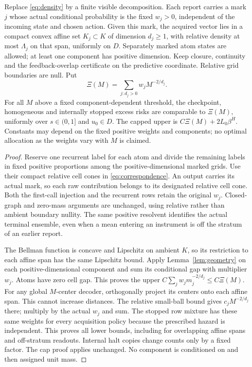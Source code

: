 \begin{theorem}\label{thm:strata}
Replace \eqref{eq:density} by a finite visible decomposition. Each report carries a mark $j$ whose actual conditional probability is the fixed $w_j>0$, independent of the incoming state and chosen action. Given this mark, the acquired vector lies in a compact convex affine set $K_j\subset K$ of dimension $d_j\ge1$, with relative density at most $\Lambda_j$ on that span, uniformly on $D$. Separately marked atom states are allowed; at least one component has positive dimension. Keep closure, continuity and the feedback-overlap certificate on the predictive coordinate. Relative grid boundaries are null. Put
\begin{equation}\label{eq:xi}
 \Xi(M)=\sum_{j:d_j>0}w_jM^{-2/d_j}.
\end{equation}
For all $M$ above a fixed component-dependent threshold, the checkpoint, homogeneous and internally stopped excess risks are comparable to $\Xi(M)$, uniformly over $s\in(0,1]$ and $u_0\in D$. The capped upper is $C\Xi(M)+2L_0\beta^H$. Constants may depend on the fixed positive weights and components; no optimal allocation as the weights vary with $M$ is claimed.
\end{theorem}
\begin{proof}
Reserve one recurrent label for each atom and divide the remaining labels in fixed positive proportions among the positive-dimensional marked grids. Use their compact relative cell cones in \eqref{eq:correspondence}. An output carries its actual mark, so each raw contribution belongs to its designated relative cell cone. Both the first-call injection and the recurrent rows retain the original $w_j$. Closed-graph and zero-mass arguments are unchanged, using relative rather than ambient boundary nullity. The same positive resolvent identifies the actual terminal ensemble, even when a mean entering an instrument is off the stratum of an earlier report.

The Bellman function is concave and Lipschitz on ambient $K$, so its restriction to each affine span has the same Lipschitz bound. Apply Lemma~\ref{lem:geometry} on each positive-dimensional component and sum its conditional gap with multiplier $w_j$. Atoms have zero cell gap. This proves the upper $C\sum_jw_jm_j^{-2/d_j}\le C\Xi(M)$. For any global $M$-center decoder, orthogonally project its centers onto each affine span. This cannot increase distances. The relative small-ball bound gives $c_jM^{-2/d_j}$ there; multiply by the actual $w_j$ and sum. The stopped row mixture has these same weights for every acquisition policy because the prescribed hazard is independent. This proves all lower bounds, including for overlapping affine spans and off-stratum readouts. Internal halt copies change counts only by a fixed factor. The cap proof applies unchanged. No component is conditioned on and then assigned unit mass.
\end{proof}
